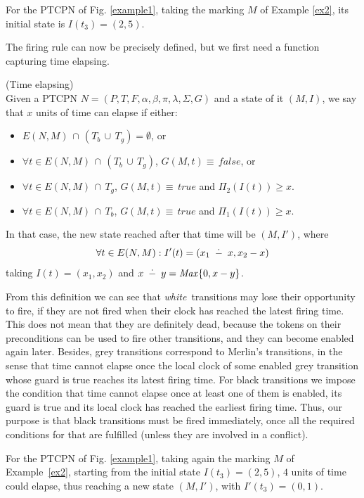 \begin{example}\label{ex3} For the PTCPN of Fig. \ref{example1}, taking the
marking $M$ of  Example \ref{ex2}, its initial  state is
\quad \(I(t_3)=(2,5)\).
\end{example}

The firing rule can now be precisely defined, but we first need a
function capturing time elapsing.

\begin{definition} (Time elapsing)\\
Given a PTCPN $N=(P,T,F,\alpha,\beta,\pi,\lambda,\Sigma, G)$ and a
state of it $(M,I)$, we say that $x$ units of time can elapse if
either:
\begin{itemize}
\item  $E(N,M)\,\cap\,(T_b\,\cup\, T_g)=\emptyset$, or
\item  $\forall t \in E(N,M)\,\cap\,(T_b\,\cup\, T_g)$, $G(M,t) \equiv\, false$, or
\item $\forall t \in  E(N,M)\,\cap\,T_g$, $G(M,t) \equiv\, true$ and  $\Pi_2(I(t)) \geq x$.
\item $\forall t \in  E(N,M)\,\cap\,T_b$, $G(M,t) \equiv\, true$ and  $\Pi_1(I(t)) \geq x$.
 \end{itemize}
%
%
In that case, the new state reached after that time will be
$(M,I')$, where
%
\[ \forall t \in E(N,M):
I'(t) = (x_1\menos x, x_2-x) \]
%
taking $I(t)=(x_1, x_2)$ and $x
\menos y = {\it Max} \{0, x - y\}$.
\end{definition}

From this definition we can see that {\em white\,} transitions may
lose their opportunity to fire, if they are not fired when their
clock has reached the latest firing time. This does not mean that
they are definitely dead, because the tokens on their preconditions
can be used to fire other transitions, and they can become enabled
again later. Besides, grey transitions correspond to  Merlin's
transitions, in the sense that time cannot elapse once the local
clock of some enabled grey transition whose guard is true reaches
its latest firing time. For black transitions we impose the
condition that time cannot elapse once at least one of them is
enabled, its guard is true and its local clock has reached the
earliest firing time. Thus, our purpose is that black transitions
must be fired immediately, once all the required conditions for that
are fulfilled (unless they are involved in a conflict).

\begin{example}\label{ex4} For the PTCPN of Fig. \ref{example1}, taking again
the marking $M$ of  \mbox{Example \ref{ex2},} starting  from the
initial state\; \(I(t_3)=(2,5)\),  $4$ units of time could elapse,
thus reaching a new state $(M,I')$, with  \(I'(t_3)=(0,1)\).
%
\end{example}

